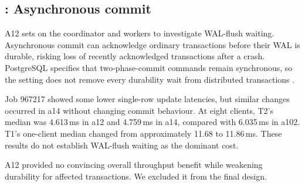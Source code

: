 \subsection{: Asynchronous commit}
A12 sets  on the coordinator and workers to
investigate WAL-flush waiting. Asynchronous commit can acknowledge ordinary
transactions before their WAL is durable, risking loss of recently acknowledged
transactions after a crash. PostgreSQL specifies that two-phase-commit commands
remain synchronous, so the setting does not remove every durability wait from
distributed transactions \citep{pg-async}.

Job 967217 showed some lower single-row update latencies, but similar changes
occurred in a14 without changing commit behaviour. At eight clients, T2's median
was 4.613\,ms in a12 and 4.759\,ms in a14, compared with 6.035\,ms in a102.
T1's one-client median changed from approximately 11.68 to 11.86\,ms.
These results do not establish WAL-flush waiting as the dominant cost.

A12 provided no convincing overall throughput benefit while weakening durability for affected transactions. We excluded it from the final design.
